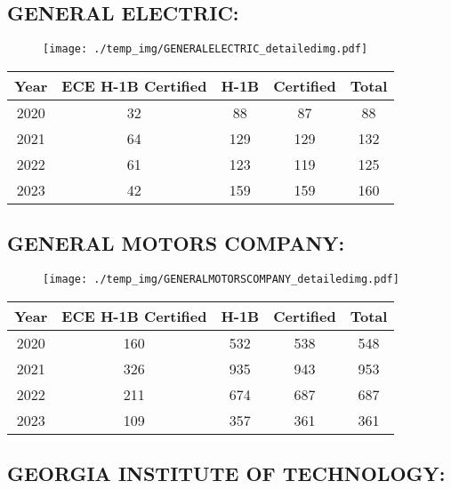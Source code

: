 \documentclass{article}%
\begin{document}
%
\newpage%
\subsection{GENERAL ELECTRIC:}%
\label{subsec:GENERALELECTRIC}%
\label{GENERALELECTRICdetailed}%


\begin{figure}[htbp]%
\centering%
\texttt{[image: ./temp\_img/GENERALELECTRIC\_detailedimg.pdf]}%
\end{figure}

%
\begin{longtable}{c|c|c|c|c}%
\hline%
Year&ECE H{-}1B Certified&H{-}1B&Certified&Total\\%
\hline%
2020&32&88&87&88\\%
\hline%
2021&64&129&129&132\\%
\hline%
2022&61&123&119&125\\%
\hline%
2023&42&159&159&160\\%
\hline%
\end{longtable}

%
\newpage%
\subsection{GENERAL MOTORS COMPANY:}%
\label{subsec:GENERALMOTORSCOMPANY}%
\label{GENERALMOTORSCOMPANYdetailed}%


\begin{figure}[htbp]%
\centering%
\texttt{[image: ./temp\_img/GENERALMOTORSCOMPANY\_detailedimg.pdf]}%
\end{figure}

%
\begin{longtable}{c|c|c|c|c}%
\hline%
Year&ECE H{-}1B Certified&H{-}1B&Certified&Total\\%
\hline%
2020&160&532&538&548\\%
\hline%
2021&326&935&943&953\\%
\hline%
2022&211&674&687&687\\%
\hline%
2023&109&357&361&361\\%
\hline%
\end{longtable}

%
\newpage%
\subsection{GEORGIA INSTITUTE OF TECHNOLOGY:}%
\label{subsec:GEORGIAINSTITUTEOFTECHNOLOGY}%
\label{GEORGIAINSTITUTEOFTECHNOLOGYdetailed}%
\end{document}
